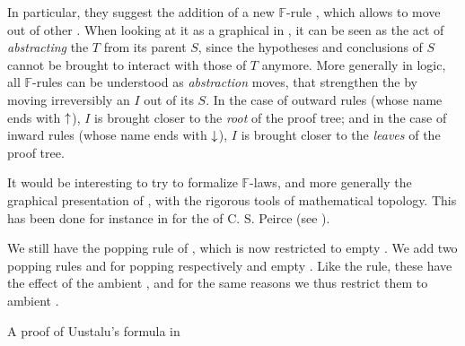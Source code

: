\begin{description}
  In particular, they suggest the addition of a new $\mathbb{F}$-rule
  , which allows to move   out of other
   . When looking at it as a graphical  in
  , it can be seen as the act of \emph{abstracting} the
   $T$ from its parent  $S$, since the hypotheses and
  conclusions of $S$ cannot be brought to interact with those of $T$ anymore.
  More generally in  logic, all $\mathbb{F}$-rules can be
  understood as \emph{abstraction} moves, that strengthen the  by
  moving irreversibly an  $I$ out of its  $S$. In the case
  of outward rules (whose name ends with $\uparrow$), $I$ is brought closer to the
  \emph{root} of the proof tree; and in the case of inward rules (whose name
  ends with $\downarrow$), $I$ is brought closer to the \emph{leaves} of the proof
  tree.
  
  It would be interesting to try to formalize $\mathbb{F}$-laws, and more
  generally the graphical presentation of , with the rigorous tools
  of mathematical topology. This has been done for instance in
   for the  of C. S.
  Peirce (see ).

  \item[\membrane] 
  We still have the popping rule  of , which is now restricted to
   empty . We add two popping rules  and  for
  popping respectively  and   empty . Like the
   rule, these have the effect of  the ambient
  , and for the same reasons we thus restrict them to  ambient
  .

  \begin{marginfigure}
    
    \caption{A proof of Uustalu's formula in }
  \end{marginfigure}


\end{description}
